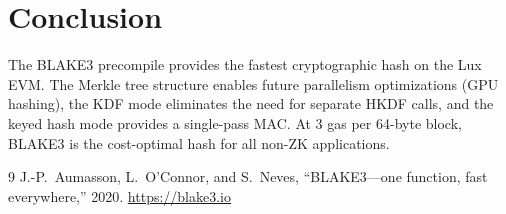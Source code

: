\documentclass[11pt,a4paper]{article}
\begin{document}
\section{Conclusion}

The BLAKE3 precompile provides the fastest cryptographic hash on the Lux EVM.
The Merkle tree structure enables future parallelism optimizations (GPU hashing),
the KDF mode eliminates the need for separate HKDF calls, and the keyed hash
mode provides a single-pass MAC. At 3 gas per 64-byte block, BLAKE3 is the
cost-optimal hash for all non-ZK applications.

\begin{thebibliography}{9}
  J.-P.~Aumasson, L.~O'Connor, and S.~Neves, ``BLAKE3---one function,
  fast everywhere,'' 2020. \url{https://blake3.io}
\end{thebibliography}
\end{document}
